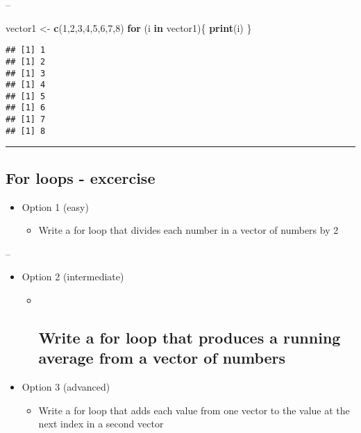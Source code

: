 \documentclass[]{article}
\newenvironment{Shaded}{\begin{snugshade}}{\end{snugshade}}
\newcommand{\ControlFlowTok}[1]{\textcolor[rgb]{0.13,0.29,0.53}{\textbf{#1}}}
\newcommand{\DecValTok}[1]{\textcolor[rgb]{0.00,0.00,0.81}{#1}}
\newcommand{\KeywordTok}[1]{\textcolor[rgb]{0.13,0.29,0.53}{\textbf{#1}}}
\newcommand{\NormalTok}[1]{#1}
\newcommand{\StringTok}[1]{\textcolor[rgb]{0.31,0.60,0.02}{#1}}
\providecommand{\tightlist}{%
  \setlength{\itemsep}{0pt}\setlength{\parskip}{0pt}}
\begin{document}
--

\begin{Shaded}
\begin{Highlighting}[]
\NormalTok{vector1 <-}\StringTok{ }\KeywordTok{c}\NormalTok{(}\DecValTok{1}\NormalTok{,}\DecValTok{2}\NormalTok{,}\DecValTok{3}\NormalTok{,}\DecValTok{4}\NormalTok{,}\DecValTok{5}\NormalTok{,}\DecValTok{6}\NormalTok{,}\DecValTok{7}\NormalTok{,}\DecValTok{8}\NormalTok{)}
\ControlFlowTok{for}\NormalTok{ (i }\ControlFlowTok{in}\NormalTok{ vector1)\{}
  \KeywordTok{print}\NormalTok{(i)}
\NormalTok{\}}
\end{Highlighting}
\end{Shaded}

\begin{verbatim}
## [1] 1
## [1] 2
## [1] 3
## [1] 4
## [1] 5
## [1] 6
## [1] 7
## [1] 8
\end{verbatim}

\begin{center}\rule{0.5\linewidth}{\linethickness}\end{center}

\hypertarget{for-loops---excercise}{%
\subsection{For loops - excercise}\label{for-loops---excercise}}

\begin{itemize}
\tightlist
\item
  Option 1 (easy)

  \begin{itemize}
  \tightlist
  \item
    Write a for loop that divides each number in a vector of numbers by
    2
  \end{itemize}
\end{itemize}

--

\begin{itemize}
\tightlist
\item
  Option 2 (intermediate)

  \begin{itemize}
  \item ~
    \hypertarget{write-a-for-loop-that-produces-a-running-average-from-a-vector-of-numbers}{%
    \subsection{Write a for loop that produces a running average from a
    vector of
    numbers}\label{write-a-for-loop-that-produces-a-running-average-from-a-vector-of-numbers}}
  \end{itemize}
\item
  Option 3 (advanced)

  \begin{itemize}
  \tightlist
  \item
    Write a for loop that adds each value from one vector to the value
    at the next index in a second vector
  \end{itemize}
\end{itemize}
\end{document}
